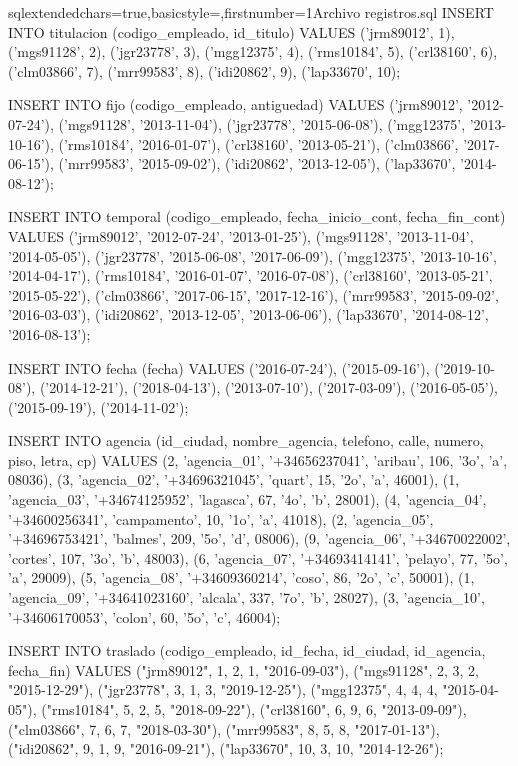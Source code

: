 \begin{sourcecodep}[]{sql}{extendedchars=true,basicstyle={\fontsize{10}{10}\selectfont\ttfamily},firstnumber=1}{Archivo registros.sql}
		INSERT INTO titulacion (codigo_empleado, id_titulo)
		VALUES 
		('jrm89012', 1),
		('mgs91128', 2),
		('jgr23778', 3),
		('mgg12375', 4),
		('rms10184', 5),
		('crl38160', 6),
		('clm03866', 7),
		('mrr99583', 8),
		('idi20862', 9),
		('lap33670', 10);
		
		INSERT INTO fijo (codigo_empleado, antiguedad)
		VALUES 
		('jrm89012', '2012-07-24'),
		('mgs91128', '2013-11-04'),
		('jgr23778', '2015-06-08'),
		('mgg12375', '2013-10-16'),
		('rms10184', '2016-01-07'),
		('crl38160', '2013-05-21'),
		('clm03866', '2017-06-15'),
		('mrr99583', '2015-09-02'),
		('idi20862', '2013-12-05'),
		('lap33670', '2014-08-12');
		
		INSERT INTO temporal (codigo_empleado, fecha_inicio_cont, fecha_fin_cont)
		VALUES 
		('jrm89012', '2012-07-24', '2013-01-25'),
		('mgs91128', '2013-11-04', '2014-05-05'),
		('jgr23778', '2015-06-08', '2017-06-09'),
		('mgg12375', '2013-10-16', '2014-04-17'),
		('rms10184', '2016-01-07', '2016-07-08'),
		('crl38160', '2013-05-21', '2015-05-22'),
		('clm03866', '2017-06-15', '2017-12-16'),
		('mrr99583', '2015-09-02', '2016-03-03'),
		('idi20862', '2013-12-05', '2013-06-06'),
		('lap33670', '2014-08-12', '2016-08-13');
		
		INSERT INTO fecha (fecha)
		VALUES 
		('2016-07-24'),
		('2015-09-16'),
		('2019-10-08'),
		('2014-12-21'),
		('2018-04-13'),
		('2013-07-10'),
		('2017-03-09'),
		('2016-05-05'),
		('2015-09-19'),
		('2014-11-02');
		
		INSERT INTO agencia (id_ciudad, nombre_agencia, telefono, calle, numero, piso, letra, cp)
		VALUES 
		(2, 'agencia_01', '+34656237041', 'aribau', 106, '3o', 'a', 08036),
		(3, 'agencia_02', '+34696321045', 'quart', 15, '2o', 'a', 46001),
		(1, 'agencia_03', '+34674125952', 'lagasca', 67, '4o', 'b', 28001),
		(4, 'agencia_04', '+34600256341', 'campamento', 10, '1o', 'a', 41018),
		(2, 'agencia_05', '+34696753421', 'balmes', 209, '5o', 'd', 08006),
		(9, 'agencia_06', '+34670022002', 'cortes', 107, '3o', 'b', 48003),
		(6, 'agencia_07', '+34693414141', 'pelayo', 77, '5o', 'a', 29009),
		(5, 'agencia_08', '+34609360214', 'coso', 86, '2o', 'c', 50001),
		(1, 'agencia_09', '+34641023160', 'alcala', 337, '7o', 'b', 28027),
		(3, 'agencia_10', '+34606170053', 'colon', 60, '5o', 'c', 46004);
		
		INSERT INTO traslado (codigo_empleado, id_fecha, id_ciudad, id_agencia, fecha_fin)
		VALUES
		("jrm89012", 1, 2, 1, "2016-09-03"),
		("mgs91128", 2, 3, 2, "2015-12-29"),
		("jgr23778", 3, 1, 3, "2019-12-25"),
		("mgg12375", 4, 4, 4, "2015-04-05"),
		("rms10184", 5, 2, 5, "2018-09-22"),
		("crl38160", 6, 9, 6, "2013-09-09"),
		("clm03866", 7, 6, 7, "2018-03-30"),
		("mrr99583", 8, 5, 8, "2017-01-13"),
		("idi20862", 9, 1, 9, "2016-09-21"),
		("lap33670", 10, 3, 10, "2014-12-26");
		

\end{sourcecodep}
